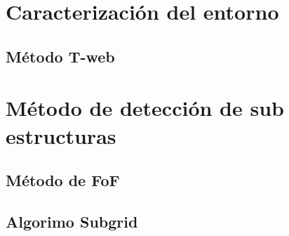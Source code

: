 \section{Caracterización del entorno}
\label{sec: Caracterizacion entorno}

    \subsection{Método T-web}
    \label{subsec: Metodo_T-web}



\section{Método de detección de sub estructuras}
\label{sec: detección sub-estructuras}

    \subsection{Método de FoF}
    \label{subsec: FoF}


    \subsection{Algorimo Subgrid}
    \label{subsec: Algoritmo subgrid}


















